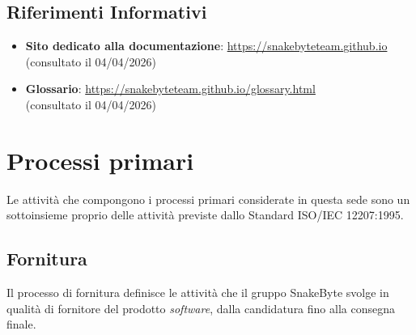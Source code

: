 \documentclass[10pt, letterpaper]{article}
\begin{document}
\subsection{Riferimenti Informativi}
\begin{itemize}
    \item \textbf{Sito dedicato alla documentazione}:
        \url{https://snakebyteteam.github.io}
        \\ (consultato il 04/04/2026)
    \item \textbf{Glossario}:
        \url{https://snakebyteteam.github.io/glossary.html}
        \\(consultato il 04/04/2026)
\end{itemize}


\section{Processi primari}
Le attività che compongono i processi primari considerate in questa sede sono un sottoinsieme proprio delle attività previste dallo Standard ISO/IEC 12207:1995.

\subsection{Fornitura}
Il processo di fornitura definisce le attività che il gruppo SnakeByte svolge in qualità di fornitore del prodotto \textit{software}, dalla candidatura fino alla consegna finale.
\end{document}
